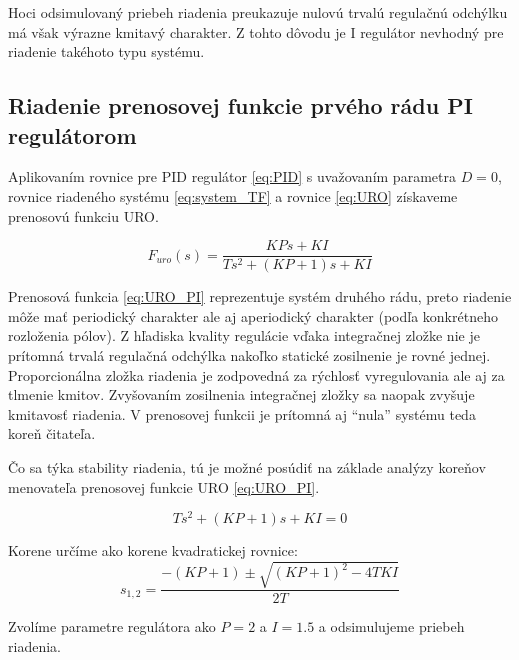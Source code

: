 \documentclass[a4paper,10pt]{article}
\begin{document}
Hoci odsimulovaný priebeh riadenia preukazuje nulovú trvalú regulačnú odchýlku má však výrazne kmitavý charakter.
Z tohto dôvodu je I regulátor nevhodný pre riadenie takéhoto typu systému.

\pagebreak

\subsection{Riadenie prenosovej funkcie prvého rádu PI regulátorom}

Aplikovaním rovnice pre PID regulátor \eqref{eq:PID} s uvažovaním parametra $D=0$, rovnice riadeného systému \eqref{eq:system_TF} a rovnice \eqref{eq:URO} získaveme prenosovú funkciu URO.

\begin{equation}
\label{eq:URO_PI}
F_{uro}(s)=\frac{KPs+KI}{Ts^2+\left(KP+1\right)s+KI}
\end{equation}

Prenosová funkcia \eqref{eq:URO_PI} reprezentuje systém druhého rádu, preto riadenie môže mať periodický charakter ale aj aperiodický charakter (podľa konkrétneho rozloženia pólov). Z hľadiska kvality regulácie vďaka integračnej zložke nie je prítomná trvalá regulačná odchýlka nakoľko statické zosilnenie je rovné jednej.
Proporcionálna zložka riadenia je zodpovedná za rýchlosť vyregulovania ale aj za tlmenie kmitov. Zvyšovaním zosilnenia integračnej zložky sa naopak zvyšuje kmitavosť riadenia.
V prenosovej funkcii je prítomná aj ``nula'' systému teda koreň čitateľa.

Čo sa týka stability riadenia, tú je možné posúdiť na základe analýzy koreňov menovateľa prenosovej funkcie URO \eqref{eq:URO_PI}.  

\begin{equation}
  Ts^2+\left(KP+1\right)s+KI=0
\end{equation} 

Korene určíme ako korene kvadratickej rovnice:
\begin{equation}
  s_{1,2}=\frac{-\left(KP+1\right)\pm \sqrt{\left(KP+1\right)^2-4TKI}}{2T}
\end{equation}

Zvolíme parametre regulátora ako $P=2$ a $I=1.5$ a odsimulujeme priebeh riadenia.
\end{document}
